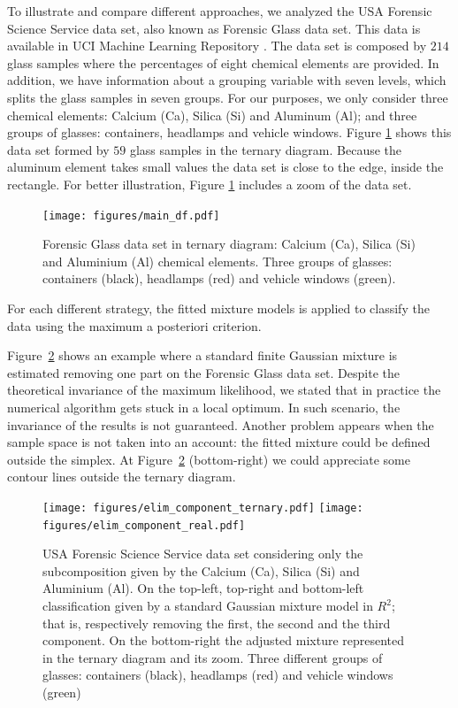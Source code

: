 \documentclass[10pt, a4paper]{article}
\begin{document}
\noindent To illustrate and compare different approaches, we analyzed the USA Forensic Science Service data set, also known as Forensic Glass data set. This data is available in UCI Machine Learning Repository \cite{Bache+Lichman:2013}.  The data set is composed by  $214$ glass samples where the percentages of eight chemical elements are provided. In addition, we have information about a grouping variable with seven levels, which splits the glass samples in seven groups. For our purposes, we only consider three chemical elements: Calcium (Ca), Silica (Si) and Aluminum (Al); and three groups of glasses: containers, headlamps and vehicle windows. Figure \ref{fig04} shows this data set formed by $59$ glass samples in the ternary diagram. Because the aluminum element takes small values the data set is close to the edge, inside the rectangle. For better illustration, Figure \ref{fig04} includes a zoom of the data set.


\begin{figure}[htbp]
\centering
\texttt{[image: figures/main\_df.pdf]}%
\caption{Forensic Glass data set in ternary diagram: Calcium (Ca), Silica (Si) and Aluminium (Al) chemical elements. Three groups of glasses: containers (black), headlamps (red) and vehicle windows (green).}
\label{fig04}
\end{figure}

For each different strategy, the fitted mixture models is applied to classify the data using the maximum a posteriori criterion.

Figure~\ref{fig05component_elimination} shows an example where a standard finite Gaussian mixture is estimated removing one part on the Forensic Glass data set. Despite the theoretical invariance of the maximum likelihood, we stated that in practice the numerical algorithm gets stuck in a local optimum. In such scenario, the invariance of the results is not guaranteed. Another problem appears when the sample space is not taken into an account: the fitted mixture could be defined outside the simplex. At Figure~\ref{fig05component_elimination} (bottom-right) we could appreciate some contour lines outside the ternary diagram.

\begin{figure}[htbp]
\centering
\texttt{[image: figures/elim\_component\_ternary.pdf]}
\texttt{[image: figures/elim\_component\_real.pdf]}



\caption{USA Forensic Science Service data set considering only the subcomposition given by the Calcium (Ca), Silica (Si) and Aluminium (Al). On the top-left, top-right and bottom-left classification given by a standard Gaussian mixture model in $R^{2}$; that is, respectively removing the first, the second and the third component. On the bottom-right the adjusted mixture represented in the ternary diagram and its zoom. Three different groups of glasses: containers (black), headlamps (red) and vehicle windows (green)}
\label{fig05component_elimination}
\end{figure}
\end{document}
